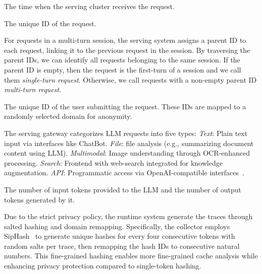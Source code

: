  The time 
when the serving cluster receives the request.  

 The unique ID of the request. 

For requests in a multi-turn session,
the serving system assigns a parent ID to each request, linking it to the previous request in the session.
By traversing the parent IDs, we can identify all requests belonging to the same session. 
If the parent ID is empty, then the request is the first-turn of a session
and we call them \emph{single-turn request}. 
Otherwise, we call requests with a non-empty parent ID \emph{multi-turn request}. 

The unique ID of the user submitting the request. 
These IDs are mapped to a randomly selected domain for anonymity. 

The serving gateway categorizes LLM requests into five types:
\emph{Text}: Plain text input via interfaces like ChatBot.
\emph{File}: file analysis (e.g., summarizing document content using LLM).
\emph{Multimodal}: Image understanding through OCR-enhanced processing.
\emph{Search}: Frontend with web-search integrated for knowledge augmentation.
\emph{API}: Programmatic access via OpenAI-compatible interfaces~\cite{openaiapi}.

The number of input tokens provided to the LLM
and the number of output tokens generated by it.

Due to the strict privacy policy,
the runtime system generate the traces 
through salted hashing and domain remapping.
Specifically, the collector employs SipHash~\cite{SipHash} to
generate unique hashes for every four consecutive tokens with random salts per trace,
then remapping the hash IDs to consecutive natural numbers.
This fine-grained hashing enables more fine-grained cache analysis
while enhancing privacy protection compared to single-token hashing.


